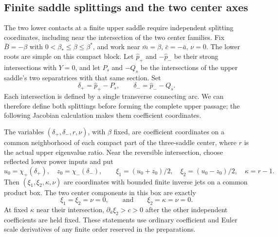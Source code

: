 \subsection{Finite saddle splittings and the two center axes}

The two lower contacts at a finite upper saddle require independent
splitting coordinates, including near the intersection of the two
center families. Fix $\bar B=-\beta$ with
$0<\beta_*\le\beta\le\beta^*$, and work near
$\bar m=\beta$, $\bar c=-\bar a$, $\nu=0$.
The lower roots are simple on this compact block. Let
$\widehat p_+$ and $-\widehat p_-$ be their strong intersections with
$Y=0$, and let $P_s$ and $-Q_s$ be the intersections of the upper
saddle's two separatrices with that same section. Set
\[
 \delta_+=\widehat p_+-P_s,\qquad
 \delta_-=\widehat p_--Q_s.
\]
Each intersection is defined by a single transverse connecting arc.
We can therefore define both splittings before forming the complete
upper passage; the following Jacobian calculation makes them
coefficient coordinates.

\begin{lemma}
\label{rw:coordinates:finite-splittings}
The variables $(\delta_+,\delta_-,r,\nu)$, with $\beta$ fixed,
are coefficient coordinates on a common neighborhood of each compact
part of the three-saddle center, where $r$ is the actual upper
eigenvalue ratio. Near the reversible intersection, choose reflected
lower power inputs and put
\begin{equation}\label{rw:coordinates:finite-axes}
 u_0=\chi_+(\delta_+),\quad z_0=\chi_-(\delta_-),\qquad
 \xi_1=(u_0+z_0)/2,\quad \xi_2=(u_0-z_0)/2,\quad \kappa=r-1.
\end{equation}
Then $(\xi_1,\xi_2,\kappa,\nu)$ are coordinates with bounded
finite inverse jets on a common product box. The two center components
in this box are exactly
\begin{equation}\label{rw:coordinates:finite-center-axes}
 \xi_1=\xi_2=\nu=0,
 \qquad\text{and}\qquad \xi_2=\kappa=\nu=0.
\end{equation}
At fixed $\kappa$ near their intersection,
$\partial_{\bar a}\xi_2>c>0$ after the other independent coefficients
are held fixed. These statements use ordinary coefficient and Euler
scale derivatives of any finite order reserved in the preparations.
\end{lemma}

